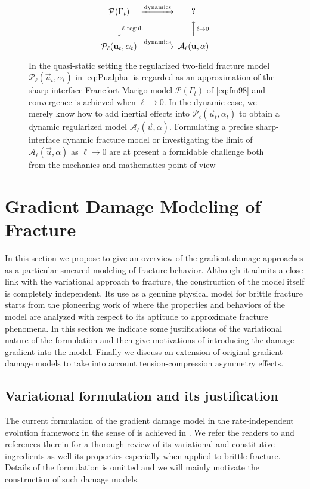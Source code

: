 \begin{figure}[htbp]
\centering
\[
\begin{CD}
\mathcal{P}(\Gamma_t) @>\text{dynamics}>> \text{?} \\
@VV\text{$\ell$-regul.}V @AA{\ell\to 0}A \\
\mathcal{P}_\ell(\vec{u}_t,\alpha_t) @>\text{dynamics}>> \mathcal{A}_\ell(\vec{u},\alpha)
\end{CD}
\]
\caption{In the quasi-static setting the regularized two-field fracture model $\mathcal{P}_\ell(\vec{u}_t,\alpha_t)$ in \eqref{eq:Pualpha} is regarded as an approximation of the sharp-interface Francfort-Marigo model $\mathcal{P}(\Gamma_t)$ of \eqref{eq:fm98} and convergence is achieved when $\ell\to 0$. In the dynamic case, we merely know how to add inertial effects into $\mathcal{P}_\ell(\vec{u}_t,\alpha_t)$ to obtain a dynamic regularized model $\mathcal{A}_\ell(\vec{u},\alpha)$. Formulating a precise sharp-interface dynamic fracture model or investigating the limit of $\mathcal{A}_\ell(\vec{u},\alpha)$ as $\ell\to 0$ are at present a formidable challenge both from the mechanics and mathematics point of view} \label{fig:fourmodels}
\end{figure}

\section{Gradient Damage Modeling of Fracture} \label{sec:graddamage}
In this section we propose to give an overview of the gradient damage approaches as a particular smeared modeling of fracture behavior. Although it admits a close link with the variational approach to fracture, the construction of the model itself is completely independent. Its use as a genuine physical model for brittle fracture starts from the pioneering work of \cite{PhamAmorMarigoMaurini:2011} where the properties and behaviors of the model are analyzed with respect to its aptitude to approximate fracture phenomena. In this section we indicate some justifications of the variational nature of the formulation and then give motivations of introducing the damage gradient into the model. Finally we discuss an extension of original gradient damage models to take into account tension-compression asymmetry effects.

\subsection{Variational formulation and its justification} \label{sec:improved}
The current formulation of the gradient damage model in the rate-independent evolution framework in the sense of \cite{Mielke:2005} is achieved in \cite{PhamMarigo:2010,PhamMarigo:2010-1}. We refer the readers to \cite{PhamAmorMarigoMaurini:2011} and references therein for a thorough review of its variational and constitutive ingredients as well its properties especially when applied to brittle fracture. Details of the formulation is omitted and we will mainly motivate the construction of such damage models.

